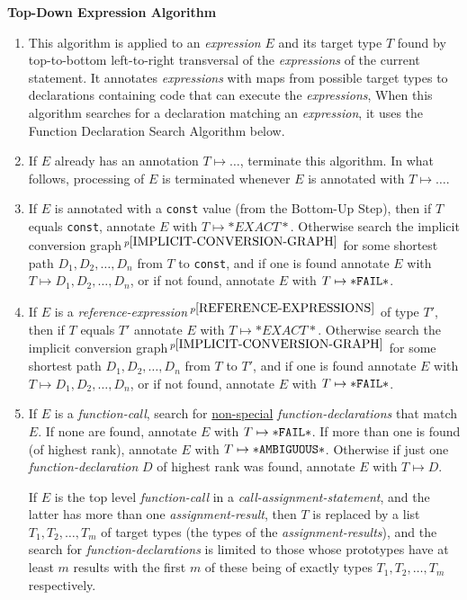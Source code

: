 \documentclass[12pt]{article}
\newcommand{\pagnote}[1]{$\,^{p\pageref{#1}}$}
\begin{document}
\centerline{\bf Top-Down Expression Algorithm}
\begin{enumerate}

\item This algorithm is applied to an {\em expression} $E$ and its
target type $T$ found by
top-to-bottom left-to-right transversal of the {\em expressions} of the
current statement.  It annotates {\em expressions} with maps from
possible target types to declarations containing code that can execute
the {\em expressions},
When this algorithm searches for a declaration matching an {\em expression},
it uses the Function Declaration Search Algorithm below.

\item If $E$ already has an annotation $T\mapsto \ldots$,
terminate this algorithm.  In what follows, processing of $E$ is
terminated whenever $E$ is annotated with $T\mapsto \ldots$.

\item If $E$ is annotated with a {\tt const} value
(from the Bottom-Up Step), then if $T$ equals {\tt const},
annotate $E$ with $T\mapsto{*EXACT*}$.
Otherwise search the implicit conversion
graph\pagnote{IMPLICIT-CONVERSION-GRAPH}
for some shortest path $D_1,D_2,\ldots,D_n$ from $T$ to {\tt const},
and if one is found annotate $E$ with $T\mapsto D_1,D_2,\ldots,D_n$,
or if not found,
annotate $E$ with $T\mapsto {\tt *FAIL*}$.

\item If $E$ is a
{\em reference-expression}\pagnote{REFERENCE-EXPRESSIONS}
of type $T'$,
then if $T$ equals $T'$ annotate $E$ with $T\mapsto{*EXACT*}$.
Otherwise search the implicit conversion
graph\pagnote{IMPLICIT-CONVERSION-GRAPH}
for some shortest path $D_1,D_2,\ldots,D_n$ from $T$ to $T'$,
and if one is found annotate $E$ with $T\mapsto D_1,D_2,\ldots,D_n$,
or if not found,
annotate $E$ with $T\mapsto {\tt *FAIL*}$.

\item If $E$ is a {\em function-call}, search for \underline{non-special}
{\em function-declarations}
that match $E$.
If none are found,
annotate $E$ with $T\mapsto{\tt *FAIL*}$.
If more than one is found (of highest rank),
annotate $E$ with $T\mapsto{\tt *AMBIGUOUS*}$.
Otherwise if just one {\em function-declaration} $D$ of highest rank was found,
annotate $E$ with $T\mapsto D$.

If $E$ is the top level {\em function-call}
in a {\em call-assignment-statement}, and the latter has
more than one {\em assignment-result}, then $T$ is replaced by a list
$T_1,T_2,\ldots,T_m$ of target types (the types of the
{\em assignment-results}), and the search for
{\em function-declarations} is limited to those whose prototypes have
at least $m$ results with the first $m$ of these being of exactly types
$T_1,T_2,\ldots,T_m$ respectively.

\end{enumerate}
\end{document}
